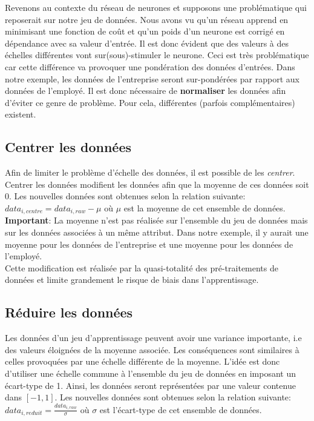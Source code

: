 \noindent Revenons au contexte du réseau de neurones et supposons une problématique qui reposerait sur notre jeu de données. Nous avons vu qu'un réseau apprend en minimisant une fonction de coût et qu'un poids d'un neurone est corrigé en dépendance avec sa valeur d'entrée. Il est donc évident que des valeurs à des échelles différentes vont sur(sous)-stimuler le neurone. Ceci est très problématique car cette différence va provoquer une pondération des données d'entrées. Dans notre exemple, les données de l'entreprise seront sur-pondérées par rapport aux données de l'employé. Il est donc nécessaire de \textbf{normaliser} les données afin d'éviter ce genre de problème. Pour cela, différentes (parfois complémentaires) existent.

\subsection{Centrer les données}
Afin de limiter le problème d'échelle des données, il est possible de les \textit{centrer}. Centrer les données modifient les données afin que la moyenne de ces données soit 0. Les nouvelles données sont obtenues selon la relation suivante: $data_{i,centre}=data_{i,raw}-\mu$ où $\mu$ est la moyenne de cet ensemble de données.\\

\noindent \textbf{Important}: La moyenne n'est pas réalisée sur l'ensemble du jeu de données mais sur les données associées à un même attribut. Dans notre exemple, il y aurait une moyenne pour les données de l'entreprise et une moyenne pour les données de l'employé.\\

\noindent Cette modification est réalisée par la quasi-totalité des pré-traitements de données et limite grandement le risque de biais dans l'apprentissage.

\subsection{Réduire les données}
Les données d'un jeu d'apprentissage peuvent avoir une variance importante, i.e des valeurs éloignées de la moyenne associée. Les conséquences sont similaires à celles provoquées par une échelle différente de la moyenne. L'idée est donc d'utiliser une échelle commune à l'ensemble du jeu de données en imposant un écart-type de 1. Ainsi, les données seront représentées par une valeur contenue dans $[-1,1]$. Les nouvelles données sont obtenues selon la relation suivante: $data_{i,reduit}=\frac{data_{i,raw}}{\sigma}$ où $\sigma$ est l'écart-type de cet ensemble de données.\\

